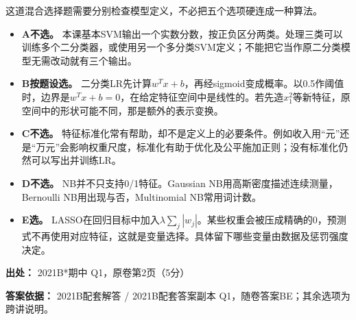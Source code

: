这道混合选择题需要分别检查模型定义，不必把五个选项硬连成一种算法。



\begin{itemize}

\item \textbf{A不选。} 本课基本SVM输出一个实数分数，按正负区分两类。处理三类可以训练多个二分类器，或使用另一个多分类SVM定义；不能把它当作原二分类模型无需改动就有三个输出。

\item \textbf{B按题设选。} 二分类LR先计算\(w^Tx+b\)，再经sigmoid变成概率。以0.5作阈值时，边界是\(w^Tx+b=0\)，在给定特征空间中是线性的。若先造\(x_1^2\)等新特征，原空间中的形状可能不同，那是额外的表示变换。

\item \textbf{C不选。} 特征标准化常有帮助，却不是定义上的必要条件。例如收入用“元”还是“万元”会影响权重尺度，标准化有助于优化及公平施加正则；没有标准化仍然可以写出并训练LR。

\item \textbf{D不选。} NB并不只支持0/1特征。Gaussian NB用高斯密度描述连续测量，Bernoulli NB用出现与否，Multinomial NB常用词计数。

\item \textbf{E选。} LASSO在回归目标中加入\(\lambda\sum_j|w_j|\)。某些权重会被压成精确的0，预测式不再使用对应特征，这就是变量选择。具体留下哪些变量由数据及惩罚强度决定。

\end{itemize}


\textbf{出处：} 2021B*期中 Q1，原卷第2页（5分）


\textbf{答案依据：} 2021B配套解答 / 2021B配套答案副本 Q1，随卷答案BE；其余选项为跨讲说明。
